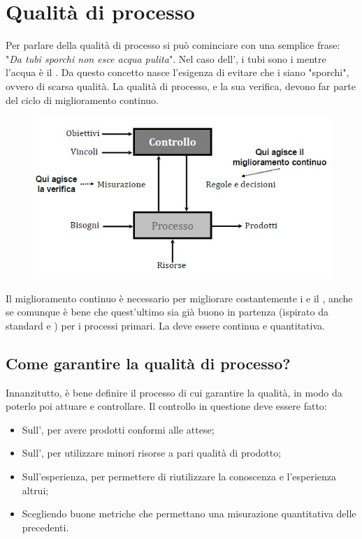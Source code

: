 \documentclass[../main]{subfiles}
\begin{document}
\section{Qualità di processo}
Per parlare della qualità di processo si può cominciare con una semplice frase: "\textit{Da tubi sporchi non esce acqua pulita}". Nel caso dell', i tubi sono i  mentre l'acqua è il .\newline
Da questo concetto nasce l'esigenza di evitare che i  siano "sporchi", ovvero di scarsa qualità. La qualità di processo, e la sua verifica, devono far parte del ciclo di miglioramento continuo.\newline
\begin{figure}[h]
    \begin{center}
        \includegraphics[scale=0.8]{immagini/processo.jpg}
    \end{center}
\end{figure}
Il miglioramento continuo è necessario per migliorare costantemente i  e il , anche se comunque è bene che quest'ultimo sia già buono in partenza (ispirato da standard e ) per i processi primari. La  deve essere continua e quantitativa.
\subsection{Come garantire la qualità di processo?}
Innanzitutto, è bene definire il processo di cui garantire la qualità, in modo da poterlo poi attuare e controllare. Il controllo in questione deve essere fatto:
\begin{itemize}
    \item Sull', per avere prodotti conformi alle attese;
    \item Sull', per utilizzare minori risorse a pari qualità di prodotto;
    \item Sull'esperienza, per permettere di riutilizzare la conoscenza e l'esperienza altrui;
    \item Scegliendo buone metriche che permettano una misurazione quantitativa delle precedenti.
\end{itemize}
\end{document}

